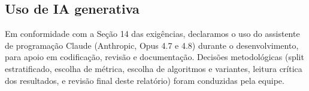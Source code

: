 \documentclass[12pt,a4paper]{article}
\begin{document}
\subsection{Uso de IA generativa}
Em conformidade com a Seção 14 das exigências, declaramos o uso do assistente de programação Claude (Anthropic, Opus 4.7 e 4.8) durante o desenvolvimento, para apoio em codificação, revisão e documentação. Decisões metodológicas (split estratificado, escolha de métrica, escolha de algoritmos e variantes, leitura crítica dos resultados, e revisão final deste relatório) foram conduzidas pela equipe.
\end{document}
